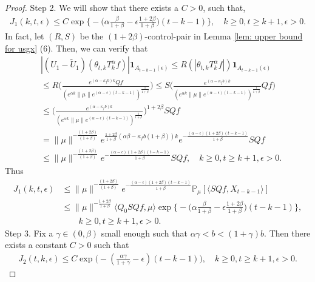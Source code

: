 \documentclass[12pt,oneside,english]{amsart}
\theoremstyle{plain}
\theoremstyle{definition}
\numberwithin{equation}{section}
\begin{document}
\begin{proof}
Step 2.  We will show that there exists a $C>0$, such that,
    \begin{align}
    \label{lemma31q}
      J_1(k,t,\epsilon)\leq C\exp\Big\{-\Big(\alpha\frac{\beta}{1+\beta}-\epsilon\frac{1+2\beta}{1+\beta}\Big)(t-k-1)\Big\},
      \quad k \geq 0, t\geq k+1, \epsilon > 0.
    \end{align}
	In fact, let $(R,S)$ be the $(1+2\beta)$-control-pair in Lemma \ref{lem: upper bound for usgx} (6).
	Then, we can verify that
\begin{align}
   & |(U_1 - \tilde U_1)(\theta_{t,k}T_k^{\alpha}f)|\mathbf{1}_{A_{t-k-1}(\epsilon)}
   \leq R(|\theta_{t,k}T_k^{\alpha}f|)\mathbf{1}_{A_{t-k-1}(\epsilon)}
   \\&\leq R \Big(\frac{e^{(\alpha-\kappa_fb)k} Qf}{(e^{\alpha k}\|\mu\|e^{(\alpha-\epsilon)(t-k-1)})^\frac{1}{1+\beta}}\Big)
    \leq S \Big(\frac{e^{(\alpha-\kappa_fb)k}}{(e^{\alpha k}\|\mu\|e^{(\alpha-\epsilon)(t-k-1)})^\frac{1}{1+\beta}}Qf\Big)
   \\&\leq \Big(\frac{e^{(\alpha-\kappa_fb)k}}{(e^{\alpha k}\|\mu\|e^{(\alpha-\epsilon)(t-k-1)})^\frac{1}{1+\beta}}\Big)^{1+2\beta}SQf
   \\&=\|\mu\|^{-\frac{(1+2\beta)}{(1+\beta)}}e^{\frac{1+2\beta}{1+\beta}(\alpha\beta-\kappa_fb(1+\beta))k}e^{-\frac{(\alpha-\epsilon)(1+2\beta)(t-k-1)}{1+\beta}}SQf
   \\&\leq\|\mu\|^{-\frac{(1+2\beta)}{(1+\beta)}} e^{-\frac{(\alpha-\epsilon)(1+2\beta)(t-k-1)}{1+\beta}}SQf,
   \quad k\geq 0, t\geq k+1, \epsilon > 0.
\end{align}
Thus
\begin{align}
\label{eq: estimate of J1}
     J_1(k,t,\epsilon)&
     \leq \|\mu\|^{-\frac{(1+2\beta)}{(1+\beta)}} e^{-\frac{(\alpha-\epsilon)(1+2\beta)(t-k-1)}{1+\beta}}\mathbb{P}_{\mu}[\langle SQf,X_{t-k-1}\rangle]\\
     & \leq \|\mu\|^{-\frac{1+2\beta}{1+\beta}} \langle Q_0 SQf, \mu \rangle \exp\Big\{-\Big(\alpha\frac{\beta}{1+\beta}-\epsilon\frac{1+2\beta}{1+\beta}\Big)(t-k-1)\Big\},
     \\ &\qquad k\geq 0, t\geq k+1, \epsilon > 0.
\end{align}
	Step 3.
	Fix a $\gamma\in(0,\beta)$ small enough such that $\alpha \gamma < b < (1+\gamma)b$.
	Then there exists a constant $C > 0$ such that
\begin{align}
\label{eq:31step3}
    J_2(t,k,\epsilon)
    \leq C \exp\Big(-(\frac{\alpha\gamma}{1+\gamma}-\epsilon)(t-k-1)\Big),
    \quad k\geq 0, t\geq k+1, \epsilon >0.
\end{align}

\end{proof}
\end{document}
